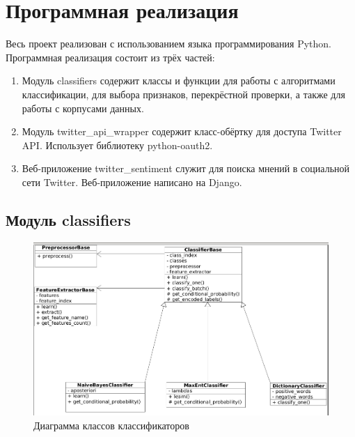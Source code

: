 \section{Программная реализация}

Весь проект реализован с использованием языка программирования Python. Программная реализация состоит из трёх частей:
\begin{enumerate}
\item 
Модуль classifiers содержит классы и функции для работы с
алгоритмами классификации, для выбора признаков,
перекрёстной проверки, а также для работы с корпусами данных.

\item 
Модуль twitter\_api\_wrapper содержит класс-обёртку для 
доступа Twitter API. Использует библиотеку python-oauth2.

\item 
Веб-приложение twitter\_sentiment служит для поиска
мнений в социальной сети Twitter. Веб-приложение написано на Django.
\end{enumerate}

\subsection{Модуль classifiers}
\begin{figure}[!ht]
\begin{center}
\includegraphics[scale=0.4, trim=1.5mm 2mm 2mm 2.6mm, clip]{../resources/uml/diag1.png}
\caption{Диаграмма классов классификаторов}
\label{gr:classifiers}
\end{center}
\end{figure} 

